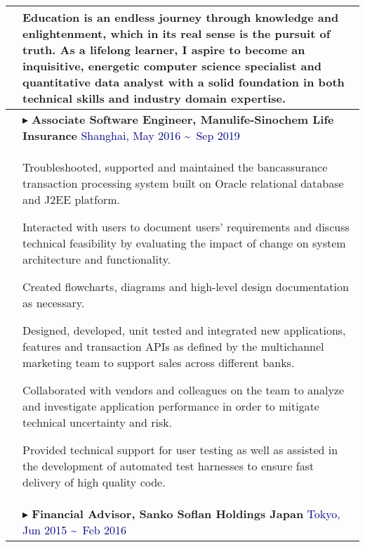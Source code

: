\documentclass[$if(fontsize)$$fontsize$,$endif$$if(lang)$$babel-lang$,$endif$$if(papersize)$$papersize$paper,$endif$$for(classoption)$$classoption$$sep$,$endfor$]{$documentclass$}
\renewenvironment{itemize}{
  \begin{list}{}{
    \setlength{\leftmargin}{1em}  %
  }
}{
  \end{list}
}
\begin{document}
\begin{tabular}{>{\centering}p{2.5cm}|p{16.5cm}}  %
    \midrule
    \multirow{3}{*}{\small\textbf{MOTIVATION}}
    & Education is an endless journey through knowledge and enlightenment, which in its real sense is the pursuit of truth. As a lifelong learner, I aspire to become an inquisitive, energetic computer science specialist and quantitative data analyst with a solid foundation in both technical skills and industry domain expertise.\\

    \midrule
    \multirow{16}{*}{\small\textbf{EMPLOYMENT}}
    & \(\blacktriangleright\) \textbf{Associate Software Engineer, Manulife-Sinochem Life Insurance} \hfill \textcolor{Navy}{Shanghai, May 2016 \textasciitilde\ Sep 2019}\\
    & \vspace{-2mm}
      \begin{itemize}
        \item[\textbullet] Troubleshooted, supported and maintained the bancassurance transaction processing system built on Oracle relational database and J2EE platform.
        \item[\textbullet] Interacted with users to document users’ requirements and discuss technical feasibility by evaluating the impact of change on system architecture and functionality.
        \item[\textbullet] Created flowcharts, diagrams and high-level design documentation as necessary.
        \item[\textbullet] Designed, developed, unit tested and integrated new applications, features and transaction APIs as defined by the multichannel marketing team to support sales across different banks.
        \item[\textbullet] Collaborated with vendors and colleagues on the team to analyze and investigate application performance in order to mitigate technical uncertainty and risk.
        \item[\textbullet] Provided technical support for user testing as well as assisted in the development of automated test harnesses to ensure fast delivery of high quality code.
      \vspace{-4mm}
      \end{itemize}\\
    & \vspace{-3mm}
    \(\blacktriangleright\) \textbf{Financial Advisor, Sanko Soflan Holdings Japan} \hfill \textcolor{Navy}{Tokyo, Jun 2015 \textasciitilde\ Feb 2016}\\

\end{tabular}
\end{document}
